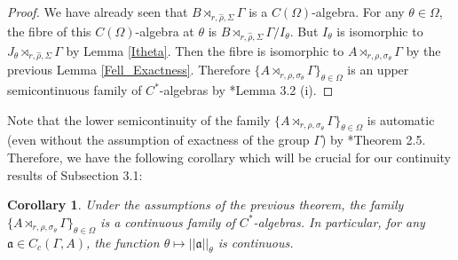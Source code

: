 \documentclass[a4paper,11pt,reqno]{amsart}
\theoremstyle{plain}
\newtheorem{cor}[thm]{Corollary}
\newtheorem{lem}[thm]{Lemma}
\theoremstyle{mainthmstyle}
\theoremstyle{named}
\numberwithin{equation}{section}
\begin{document}
\begin{proof}
We have already seen that $B \rtimes_{r, \hat{\rho}, \Sigma} \Gamma$ is a $C(\Omega)$-algebra. For any $\theta\in\Omega$, the fibre of this $C(\Omega)$-algebra at $\theta$ is $B \rtimes_{r, \hat{\rho}, \Sigma} \Gamma /I_{\theta}$. But $I_{\theta}$ is isomorphic to $J_{\theta}\rtimes_{r,\hat{\rho},\Sigma}\Gamma$ by Lemma \ref{Itheta}. Then the fibre is isomorphic to $A\rtimes_{r,\rho,\sigma_{\theta}}\Gamma$ by the previous Lemma \ref{Fell_Exactness}. Therefore $\{A\rtimes_{r,\rho,\sigma_{\theta}}\Gamma\}_{\theta\in\Omega}$ is an upper semicontinuous family of $C^{\ast}$-algebras by \cite{Dadarlat-Winter}*{Lemma 3.2 (i)}.  
\end{proof}
Note that the lower semicontinuity of the family $\{A\rtimes_{r,\rho,\sigma_{\theta}}\Gamma\}_{\theta\in\Omega}$ is automatic (even without the assumption of exactness of the group $\Gamma$) by \cite{Rieffel-Cont}*{Theorem 2.5}. Therefore, we have the following corollary which will be crucial for our continuity results of Subsection 3.1:
\begin{cor}\label{continuousfielCalgebras}
    Under the assumptions of the previous theorem, the family $\{A\rtimes_{r,\rho,\sigma_{\theta}}\Gamma\}_{\theta\in\Omega}$ is a continuous family of $C^{\ast}$-algebras. In particular, for any $\mathfrak{a}\in C_{c}(\Gamma,A)$, the function $\theta\mapsto\lvert\lvert\mathfrak{a}\rvert\rvert_{\theta}$ is continuous.
\end{cor}


\end{document}
